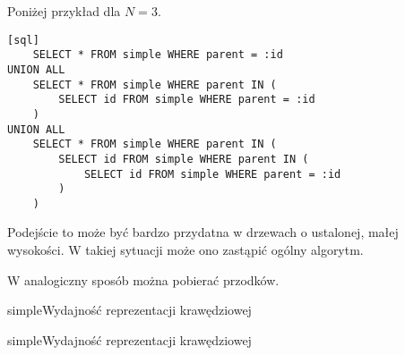 Poniżej przykład dla $N = 3$.

\begin{verbatim}[sql]
    SELECT * FROM simple WHERE parent = :id
UNION ALL 
    SELECT * FROM simple WHERE parent IN (
        SELECT id FROM simple WHERE parent = :id
    )
UNION ALL
    SELECT * FROM simple WHERE parent IN (
        SELECT id FROM simple WHERE parent IN (
            SELECT id FROM simple WHERE parent = :id
        )
    )
\end{verbatim}

Podejście to może być bardzo przydatna w drzewach o ustalonej, małej wysokości.
W takiej sytuacji może ono zastąpić ogólny algorytm.

W analogiczny sposób można pobierać przodków.








%
%


\begin{qxtab}{simple}{Wydajność reprezentacji krawędziowej}
\end{qxtab}

\begin{qxfig}{simple}{Wydajność reprezentacji krawędziowej}
\end{qxfig}

